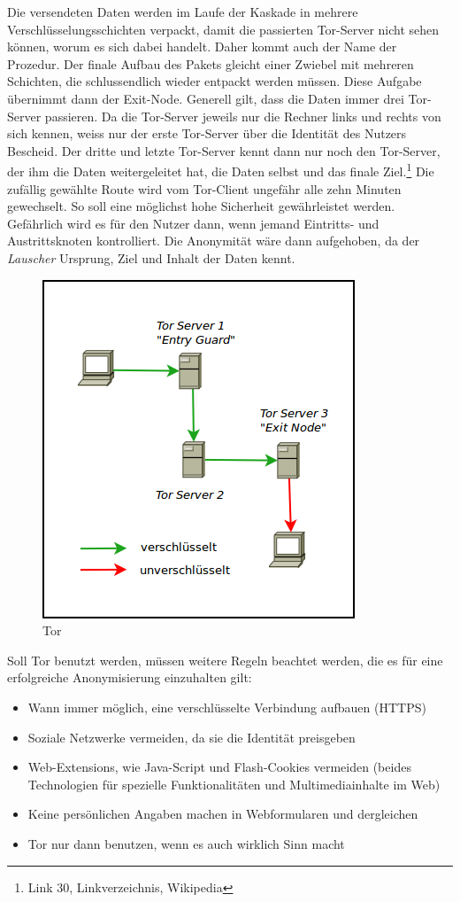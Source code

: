 Die versendeten Daten werden im Laufe der Kaskade in mehrere Verschlüsselungsschichten verpackt, damit die passierten Tor-Server nicht sehen können, worum es sich dabei handelt. Daher kommt auch der Name der Prozedur. Der finale Aufbau des Pakets gleicht einer Zwiebel mit mehreren Schichten, die  schlussendlich wieder entpackt werden müssen. Diese Aufgabe übernimmt dann der Exit-Node. Generell gilt, dass die Daten immer drei Tor-Server passieren. Da die Tor-Server jeweils nur die Rechner links und rechts von sich kennen, weiss nur der erste Tor-Server über die Identität des Nutzers Bescheid. Der dritte und letzte Tor-Server kennt dann nur noch den Tor-Server, der ihm die Daten weitergeleitet hat, die Daten selbst und das finale Ziel.\footnote{Link 30, Linkverzeichnis, Wikipedia}
Die zufällig gewählte Route wird vom Tor-Client ungefähr alle zehn Minuten gewechselt. So soll eine möglichst hohe Sicherheit gewährleistet werden. Gefährlich wird es für den Nutzer dann, wenn jemand Eintritts- und Austrittsknoten kontrolliert. Die Anonymität wäre dann aufgehoben, da der \textit{Lauscher} Ursprung, Ziel und Inhalt der Daten kennt.

\begin{figure}[H]
\centering
\includegraphics[scale=0.7]{images/tor}
\caption{Tor}
\end{figure}

Soll Tor benutzt werden, müssen weitere Regeln beachtet werden, die es für eine erfolgreiche Anonymisierung einzuhalten gilt:
\begin{itemize}
\item Wann immer möglich, eine verschlüsselte Verbindung aufbauen (HTTPS)
\item Soziale Netzwerke vermeiden, da sie die Identität preisgeben
\item Web-Extensions, wie Java-Script und Flash-Cookies vermeiden (beides Technologien für spezielle Funktionalitäten und Multimediainhalte im Web)
\item Keine persönlichen Angaben machen in Webformularen und dergleichen
\item Tor nur dann benutzen, wenn es auch wirklich Sinn macht
\end{itemize}

